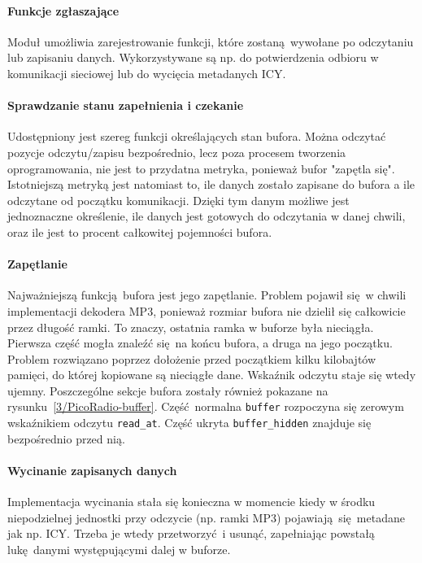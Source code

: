 \documentclass[12pt]{report}
\begin{document}
	\paragraph{Funkcje zgłaszające}
		Moduł umożliwia zarejestrowanie funkcji, które zostaną wywołane po odczytaniu lub zapisaniu danych. Wykorzystywane są np. do potwierdzenia odbioru w komunikacji sieciowej lub do wycięcia metadanych ICY.
	
	\paragraph{Sprawdzanie stanu zapełnienia i czekanie}
		Udostępniony jest szereg funkcji określających stan bufora. Można odczytać pozycje odczytu/zapisu bezpośrednio, lecz poza procesem tworzenia oprogramowania, nie jest to przydatna metryka, ponieważ bufor "zapętla się". Istotniejszą metryką jest natomiast to, ile danych zostało zapisane do bufora a ile odczytane od początku komunikacji. Dzięki tym danym możliwe jest jednoznaczne określenie, ile danych jest gotowych do odczytania w danej chwili, oraz ile jest to procent całkowitej pojemności bufora.
	
	\paragraph{Zapętlanie}
		Najważniejszą funkcją bufora jest jego zapętlanie. Problem pojawił się w chwili implementacji dekodera MP3, ponieważ rozmiar bufora nie dzielił się całkowicie przez długość ramki. To znaczy, ostatnia ramka w buforze była nieciągła. Pierwsza część mogła znaleźć się na końcu bufora, a druga na jego początku. Problem rozwiązano poprzez dołożenie przed początkiem kilku kilobajtów pamięci, do której kopiowane są nieciągłe dane. Wskaźnik odczytu staje się wtedy ujemny. Poszczególne sekcje bufora zostały również pokazane na rysunku~\ref{3/PicoRadio-buffer}. Część normalna \lstinline|buffer| rozpoczyna się zerowym wskaźnikiem odczytu \lstinline|read_at|. Część ukryta \lstinline|buffer_hidden| znajduje się bezpośrednio przed nią.
	
	\paragraph{Wycinanie zapisanych danych}
		Implementacja wycinania stała się konieczna w momencie kiedy w środku niepodzielnej jednostki przy odczycie (np. ramki MP3) pojawiają się metadane jak np. ICY. Trzeba je wtedy przetworzyć i usunąć, zapełniając powstałą lukę danymi występującymi dalej w buforze.
	
\end{document}
